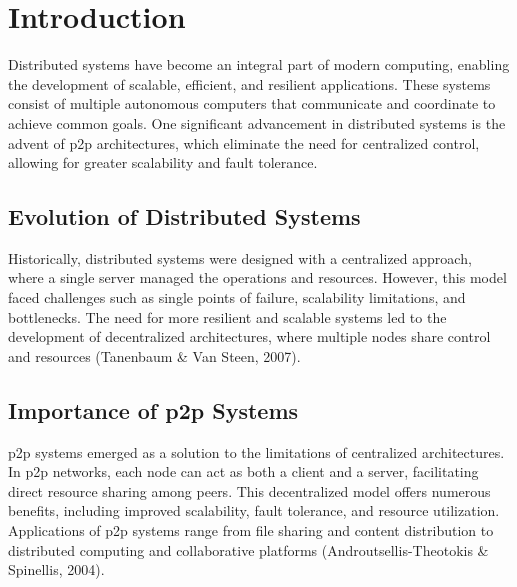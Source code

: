 \chapter{Introduction}\label{chap:intro}

Distributed systems have become an integral part of modern computing, enabling the development of scalable, efficient, and resilient applications.
These systems consist of multiple autonomous computers that communicate and coordinate to achieve common goals.
One significant advancement in distributed systems is the advent of \gls{p2p} architectures, which eliminate the need for centralized control, allowing for greater scalability and fault tolerance.

\section{Evolution of Distributed Systems}
Historically, distributed systems were designed with a centralized approach, where a single server managed the operations and resources.
However, this model faced challenges such as single points of failure, scalability limitations, and bottlenecks.
The need for more resilient and scalable systems led to the development of decentralized architectures, where multiple nodes share control and resources (Tanenbaum \& Van Steen, 2007).

\section{Importance of \gls{p2p} Systems}

\gls{p2p} systems emerged as a solution to the limitations of centralized architectures.
In \gls{p2p} networks, each node can act as both a client and a server, facilitating direct resource sharing among peers.
This decentralized model offers numerous benefits, including improved scalability, fault tolerance, and resource utilization.
Applications of \gls{p2p} systems range from file sharing and content distribution to distributed computing and collaborative platforms (Androutsellis-Theotokis \& Spinellis, 2004).